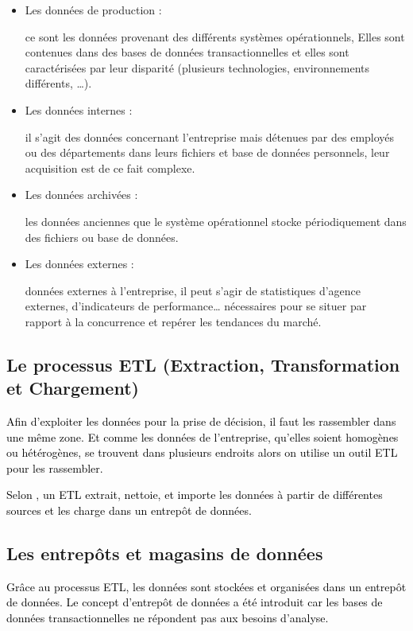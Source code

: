 \documentclass[a4paper,12pt]{report}
\begin{document}
\begin{itemize}
	\item  \begin{bf}Les données de production : \end{bf}ce sont les données provenant des différents systèmes opérationnels, Elles sont contenues dans des bases de  données transactionnelles et elles sont caractérisées par leur disparité (plusieurs technologies, environnements différents, …).
	\item  \begin{bf}Les données internes :  \end{bf}il s’agit des données concernant l’entreprise mais détenues par des employés ou des départements dans leurs  fichiers et base de données personnels, leur acquisition est de ce fait complexe. 
	\item  \begin{bf}Les données archivées : \end{bf}les données anciennes que le système opérationnel stocke périodiquement dans des fichiers ou base de données.  
	\item  \begin{bf}Les données externes : \end{bf} données externes à l’entreprise, il peut s’agir de statistiques d’agence externes, d’indicateurs de performance… nécessaires pour se situer par rapport à la concurrence et repérer les tendances du marché.
\end{itemize}
\subsection{Le processus ETL (Extraction, Transformation et Chargement)}
\textcolor{black}{Afin d’exploiter les données pour la prise de décision, il faut les rassembler dans une même zone. Et comme les données de l’entreprise, qu’elles soient homogènes ou hétérogènes, se trouvent dans plusieurs endroits alors on utilise un outil ETL pour les rassembler.}

\textcolor{black}{Selon \citep{polet12infor}, un ETL extrait, nettoie, et importe les données à partir de  différentes sources et les charge dans un entrepôt de données.}

\subsection{Les entrepôts et magasins de données}
\textcolor{black}{Grâce au processus ETL, les données sont stockées et organisées dans un entrepôt de données. Le concept d’entrepôt de données a été introduit car les bases de données transactionnelles ne  répondent pas aux besoins d’analyse.}
\end{document}
